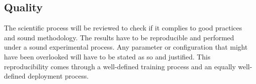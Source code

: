 \subsection{Quality}

The scientific process will be reviewed to check if it complies to good practices and sound methodology. The results have to be reproducible and performed under a sound experimental process. Any parameter or configuration that might have been overlooked will have to be stated as so and justified. This reproducibility comes through a well-defined training process and an equally well-defined deployment process.
